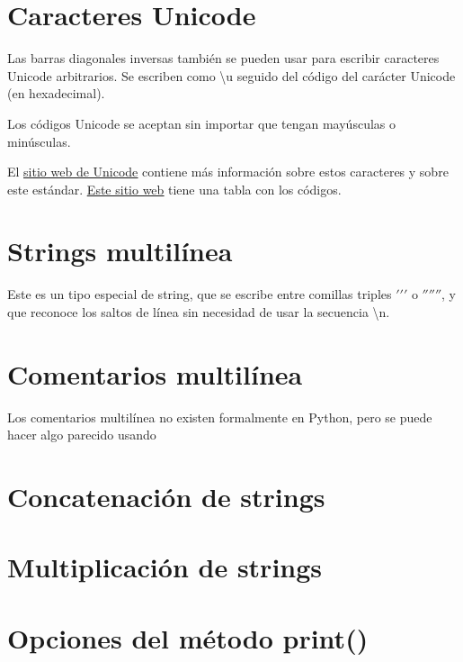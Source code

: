 \documentclass{report}
\begin{document}
\section{Caracteres Unicode}

Las barras diagonales inversas también se pueden usar para escribir caracteres Unicode arbitrarios. Se escriben como \textbackslash u seguido del código del carácter Unicode (en hexadecimal).

Los códigos Unicode se aceptan sin importar que tengan mayúsculas o minúsculas.


El \href{https://unicode.org/}{\underline{sitio web de Unicode}} contiene más información sobre estos caracteres y sobre este estándar. \href{https://unicode-table.com/en/}{\underline{Este sitio web}} tiene una tabla con los códigos.

\section{Strings multilínea}

Este es un tipo especial de string, que se escribe entre comillas triples $'$$'$$'$ o $''$$''$$''$, y que reconoce los saltos de línea sin necesidad de usar la secuencia \textbackslash n.


\section{Comentarios multilínea}

Los comentarios multilínea no existen formalmente en Python, pero se puede hacer algo parecido usando


\section{Concatenación de strings}

\section{Multiplicación de strings}

\section{Opciones del método print()}
\end{document}
